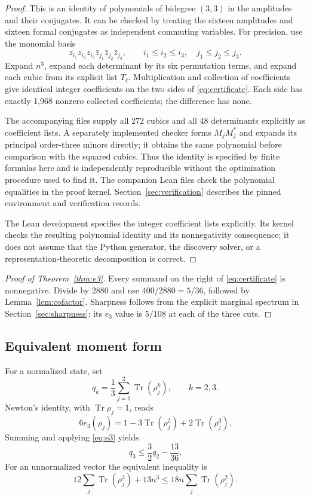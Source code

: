\documentclass[11pt]{article}
\theoremstyle{definition}
\theoremstyle{remark}
\DeclareMathOperator{\Tr}{Tr}
\begin{document}
\begin{proof}
This is an identity of polynomials of bidegree $(3,3)$ in the amplitudes
and their conjugates. It can be checked by treating the sixteen amplitudes
and sixteen formal conjugates as independent commuting variables.
For precision, use the monomial basis
\[
 z_{i_1}z_{i_2}z_{i_3}\bar z_{j_1}\bar z_{j_2}\bar z_{j_3},
 \qquad i_1\leq i_2\leq i_3,\quad j_1\leq j_2\leq j_3.
\]
Expand $n^3$, expand each determinant by its six permutation terms,
and expand each cubic from its explicit list $T_\ell$.
Multiplication and collection of coefficients give
identical integer coefficients on the two sides of
\eqref{eq:certificate}. Each side has exactly 1,968 nonzero collected
coefficients; the difference has none.

The accompanying files supply all 272 cubics and all 48
determinants explicitly as coefficient lists. A separately implemented
checker forms $M_jM_j^*$ and expands its principal order-three minors
directly; it obtains the same polynomial before comparison with the
squared cubics. Thus the identity is specified by finite formulas here
and is independently reproducible without the optimization procedure
used to find it. The companion Lean files check the polynomial equalities
in the proof kernel. Section~\ref{sec:verification} describes the pinned
environment and verification records.

The Lean development specifies the integer coefficient lists explicitly.
Its kernel checks the resulting polynomial
identity and its nonnegativity consequence; it does not assume that the
Python generator, the discovery solver, or a representation-theoretic
decomposition is correct.
\end{proof}

\begin{proof}[Proof of Theorem~\ref{thm:e3}]
Every summand on the right of \eqref{eq:certificate} is nonnegative.
Divide by $2880$ and use $400/2880=5/36$, followed by
Lemma~\ref{lem:cofactor}. Sharpness follows from the explicit marginal
spectrum in Section~\ref{sec:sharpness}: its $e_3$ value is $5/108$
at each of the three cuts.
\end{proof}

\subsection{Equivalent moment form}

For a normalized state, set
\begin{equation}
 q_k=\frac13\sum_{j=0}^2\Tr(\rho_j^k),\qquad k=2,3.
 \label{eq:qk}
\end{equation}
Newton's identity, with $\Tr\rho_j=1$, reads
\begin{equation}
 6e_3(\rho_j)=1-3\Tr(\rho_j^2)+2\Tr(\rho_j^3).
 \label{eq:newton}
\end{equation}
Summing and applying \eqref{eq:e3} yields
\begin{equation}
 q_3\leq\frac32q_2-\frac{13}{36}.
 \label{eq:moment}
\end{equation}
For an unnormalized vector the equivalent inequality is
\[
 12\sum_j\Tr(\rho_j^3)+13n^3
 \leq18n\sum_j\Tr(\rho_j^2).
\]
\end{document}
